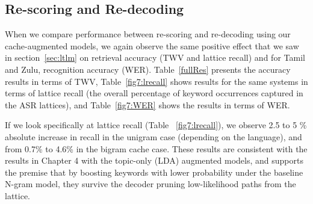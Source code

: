 \subsection{Re-scoring and Re-decoding}

When we compare performance between re-scoring and re-decoding using our cache-augmented models, we again observe the same positive effect that we saw in section~\ref{sec:ltlm} on retrieval accuracy (TWV and lattice recall) and for Tamil and Zulu, recognition accuracy (WER).  Table~\ref{fullRes} presents the accuracy results in terms of TWV, Table~\ref{fig7:lrecall} shows results for the same systems in terms of lattice recall (the overall percentage of keyword occurrences captured in the ASR lattices), and Table~\ref{fig7:WER} shows the results in terms of WER.  

If we look specifically at lattice recall (Table~
\ref{fig7:lrecall}), we observe 2.5 to 5 \% absolute increase in recall in the unigram case (depending on the language), and from 0.7\% to 4.6\% in the bigram cache case.  These results are consistent with the results in Chapter 4 with the topic-only (LDA) augmented models, and supports the premise that by boosting keywords with lower probability under the baseline N-gram  model, they survive the decoder pruning low-likelihood paths from the lattice.    





